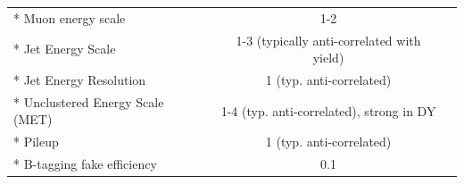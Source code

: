\begin{table}[htb]
{\begin{tabular}{lccccccc}
* Muon energy scale                            & \multicolumn{6}{c}{1-2}                                                      &           \\
* Jet Energy Scale                             & \multicolumn{6}{c}{1-3 (typically anti-correlated with yield)}               &           \\
* Jet Energy Resolution                        & \multicolumn{6}{c}{1 (typ. anti-correlated)}                                 &           \\
* Unclustered Energy Scale (MET)               & \multicolumn{6}{c}{1-4 (typ. anti-correlated), strong in DY}                 &           \\
* Pileup                                       & \multicolumn{6}{c}{1 (typ. anti-correlated)}                                 &           \\
* B-tagging fake efficiency                    & \multicolumn{6}{c}{0.1}                                                      &           \\
\hline
\end{tabular}
}
\label{tab:syst}
\end{table}

